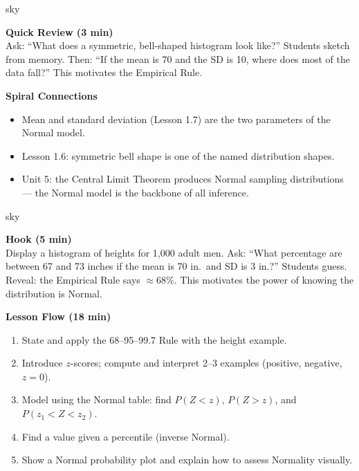 \documentclass[10pt]{article}
\begin{document}
\boxguard
\begin{skillbox}{sky}
\begin{minipage}[t]{0.48\linewidth}
    \textbf{Quick Review (3 min)}\\
    Ask: ``What does a symmetric, bell-shaped histogram look like?'' Students sketch from memory. Then: ``If the mean is 70 and the SD is 10, where does most of the data fall?'' This motivates the Empirical Rule.
\end{minipage}
\hfill
\begin{minipage}[t]{0.48\linewidth}
    \textbf{Spiral Connections}
    \begin{itemize}
        \item Mean and standard deviation (Lesson 1.7) are the two parameters of the Normal model.
        \item Lesson 1.6: symmetric bell shape is one of the named distribution shapes.
        \item Unit 5: the Central Limit Theorem produces Normal sampling distributions --- the Normal model is the backbone of all inference.
    \end{itemize}
\end{minipage}
\end{skillbox}

\boxguard
\begin{skillbox}{sky}
\begin{minipage}[t]{0.48\linewidth}
    \textbf{Hook (5 min)}\\
    Display a histogram of heights for 1{,}000 adult men. Ask: ``What percentage are between 67 and 73 inches if the mean is 70 in.\ and SD is 3 in.?'' Students guess. Reveal: the Empirical Rule says $\approx 68\%$. This motivates the power of knowing the distribution is Normal.
\end{minipage}
\hfill
\begin{minipage}[t]{0.48\linewidth}
    \textbf{Lesson Flow (18 min)}
    \begin{enumerate}
        \item State and apply the 68--95--99.7 Rule with the height example.
        \item Introduce $z$-scores; compute and interpret 2--3 examples (positive, negative, $z=0$).
        \item Model using the Normal table: find $P(Z < z)$, $P(Z > z)$, and $P(z_1 < Z < z_2)$.
        \item Find a value given a percentile (inverse Normal).
        \item Show a Normal probability plot and explain how to assess Normality visually.
    \end{enumerate}
\end{minipage}
\end{skillbox}
\end{document}
